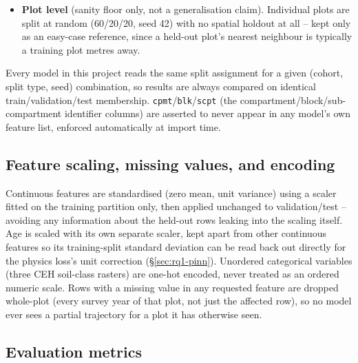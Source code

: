\begin{itemize}
  never saw, a different and harder question than spatial generalisation. A narrow-gap variant
  (training years closer to the test year) is also defined for a secondary check; its validation
  year is deliberately the earliest available year, not a middle year, because holding out a
  middle year left the PINN's trajectory-pair loss with no pairable plots in one smoke test.
\item \textbf{Plot level} (sanity floor only, not a generalisation claim). Individual plots are
  split at random (60/20/20, seed 42) with no spatial holdout at all -- kept only as an easy-case
  reference, since a held-out plot's nearest neighbour is typically a training plot metres away.
\end{itemize}

Every model in this project reads the same split assignment for a given (cohort, split type,
seed) combination, so results are always compared on identical train/validation/test membership.
\texttt{cpmt}/\texttt{blk}/\texttt{scpt} (the compartment/block/sub-compartment identifier
columns) are asserted to never appear in any model's own feature list, enforced automatically at
import time.

\subsection{Feature scaling, missing values, and encoding}

Continuous features are standardised (zero mean, unit variance) using a scaler fitted on the
training partition only, then applied unchanged to validation/test -- avoiding any information
about the held-out rows leaking into the scaling itself. Age is scaled with its own separate
scaler, kept apart from other continuous features so its training-split standard deviation can be
read back out directly for the physics loss's unit correction (\S\ref{sec:rq1-pinn}). Unordered
categorical variables (three CEH soil-class rasters) are one-hot encoded, never treated as an
ordered numeric scale. Rows with a missing value in any requested feature are dropped whole-plot
(every survey year of that plot, not just the affected row), so no model ever sees a partial
trajectory for a plot it has otherwise seen.

\subsection{Evaluation metrics}
\label{sec:metrics}

